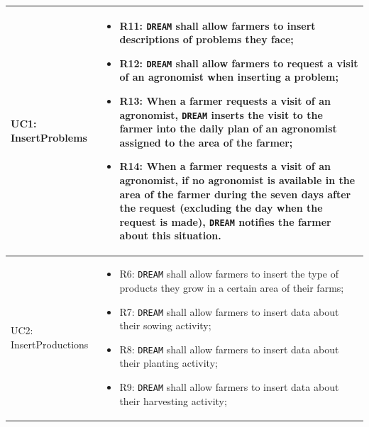 \documentclass{article}
\begin{document}
\begin{longtable}[c]{|m{}|m{8cm}|}

  \hline
  \item UC1: InsertProblems & 
    \begin{itemize}
        \item R11: \verb|DREAM| shall allow farmers to insert descriptions of problems they face;
    
  \item R12: \verb|DREAM| shall allow farmers to request a visit of an agronomist when inserting a problem;

  \item R13: When a farmer requests a visit of an agronomist, \verb|DREAM| inserts the visit to the farmer into the daily plan of an agronomist assigned to the area of the farmer;

  \item R14: When a farmer requests a visit of an agronomist, if no agronomist is available in the area of the farmer during the seven days after the request (excluding the day when the request is made), \verb|DREAM| notifies the farmer about this situation.
    \end{itemize}\\
\hline
\item UC2: InsertProductions &
    \begin{itemize}
        \item R6: \verb|DREAM| shall allow farmers to insert the type of products they grow in a certain area of their farms;

        \item R7: \verb|DREAM| shall allow farmers to insert data about their sowing activity;
    
        \item R8: \verb|DREAM| shall allow farmers to insert data about their planting activity;
        
        \item R9: \verb|DREAM| shall allow farmers to insert data about their harvesting activity;
        

\end{itemize}
\end{longtable}
\end{document}
